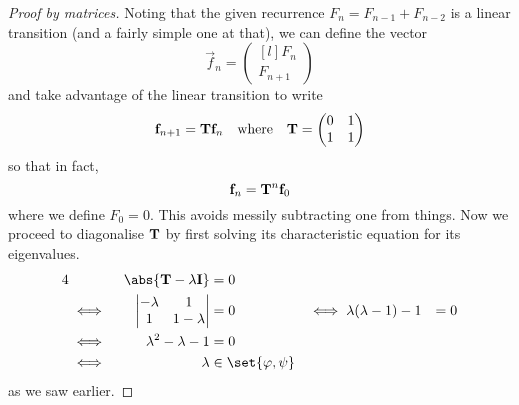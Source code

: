 \begin{proof}[Proof by matrices]
    Noting that the given recurrence \(F_n = F_{n - 1} + F_{n - 2}\) is a linear
    transition (and a fairly simple one at that), we can define the vector
    \begin{equation*}
        \vec f_n =
        \begin{pmatrix*}[l]
            F_n \\
            F_{n + 1}
        \end{pmatrix*}
    \end{equation*}
    and take advantage of the linear transition to write
    \begin{equation*}
        \mathrm{\mathbf{f}}_{n + 1} = \mathbf{T} \mathrm{\mathbf{f}}_n \quad \text{where} \quad
        \mathbf{T} =
        \begin{pmatrix}
            0 & 1 \\
            1 & 1
        \end{pmatrix}
    \end{equation*}
    so that in fact,
    \begin{equation*}
        \mathrm{\mathbf{f}}_n = \mathbf{T}^n\mathrm{\mathbf{f}}_0
    \end{equation*}
    where we define \(F_0 = 0\). This avoids messily subtracting one from
    things. Now we proceed to diagonalise \(\mathbf{T}\) by first solving its
    characteristic equation for its eigenvalues.
    \begin{alignat*}4
        && \abs{\mat T - \lambda \mat I} &= 0 \\
        &\iff{}&
            \begin{vmatrix}
                -\lambda & 1 \\
                1 & 1 - \lambda
            \end{vmatrix} &= 0
        &\iff{}& \lambda (\lambda - 1) - 1 &= 0 \\
        &\iff{}& \lambda^2 - \lambda - 1 &= 0 \\
        &\iff{}& \lambda &\in \set{\varphi, \psi}
    \end{alignat*}
    as we saw earlier.


\end{proof}
